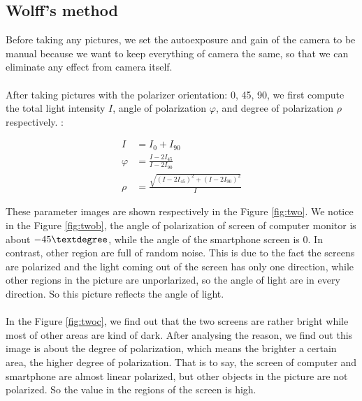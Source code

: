 \documentclass[english]{article}
\begin{document}
\subsection{Wolff's method}
Before taking any pictures, we set the autoexposure and gain of the camera to be manual because we want to keep everything of camera the same, so that we can eliminate any effect from camera itself.\\
\\
After taking pictures with the polarizer orientation: 0\textdegree, 45\textdegree, 90\textdegree, we first compute the total light intensity $I$, angle of polarization $\varphi$, and degree of polarization $\rho$ respectively. :

\begin{align*} 
	I &= I_{0} + I_{90}\\
	\varphi &= \frac{I - 2I_{45}} {I - 2I_{90}}\\
	\rho &= \frac{\sqrt{(I-2I_{45})^{2} + (I-2I_{90})^{2}}}{I}
\end{align*}

These parameter images are shown respectively in the Figure \ref{fig:two}. We notice in the Figure \ref{fig:twob}, the angle of polarization of screen of computer monitor is about $-45\textdegree$, while the angle of the smartphone screen is 0\textdegree. In contrast, other region are full of random noise. This is due to the fact the screens are polarized and the light coming out of the screen has only one direction, while other regions in the picture are unporlarized, so the angle of light are in every direction. So this picture reflects the angle of light. \\
\\
In the Figure \ref{fig:twoc}, we find out that the two screens are rather bright while most of other areas are kind of dark. After analysing the reason, we find out this image is about the degree of polarization, which means the brighter a certain area, the higher degree of polarization. That is to say, the screen of computer and smartphone are almost linear polarized, but other objects in the picture are not polarized. So the value in the regions of the screen is  high.
\end{document}

